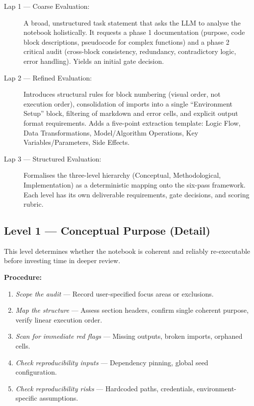 \documentclass[11pt, a4paper]{article}
\begin{document}
\begin{description}
  \item[Lap 1 — Coarse Evaluation:] A broad, unstructured task statement that
    asks the LLM to analyse the notebook holistically. It requests a phase 1
    documentation (purpose, code block descriptions, pseudocode for complex
    functions) and a phase 2 critical audit (cross-block consistency,
    redundancy, contradictory logic, error handling). Yields an initial gate
    decision.

  \item[Lap 2 — Refined Evaluation:] Introduces structural rules for block
    numbering (visual order, not execution order), consolidation of imports
    into a single ``Environment Setup'' block, filtering of markdown and error
    cells, and explicit output format requirements. Adds a five-point
    extraction template: Logic Flow, Data Transformations, Model/Algorithm
    Operations, Key Variables/Parameters, Side Effects.

  \item[Lap 3 — Structured Evaluation:] Formalises the three-level hierarchy
    (Conceptual, Methodological, Implementation) as a deterministic mapping
    onto the six-pass framework. Each level has its own deliverable
    requirements, gate decisions, and scoring rubric.
\end{description}

\subsection*{Level 1 — Conceptual Purpose (Detail)}

This level determines whether the notebook is coherent and reliably
re-executable before investing time in deeper review.

\textbf{Procedure:}
\begin{enumerate}
  \item \textit{Scope the audit} — Record user-specified focus areas or
    exclusions.
  \item \textit{Map the structure} — Assess section headers, confirm single
    coherent purpose, verify linear execution order.
  \item \textit{Scan for immediate red flags} — Missing outputs, broken
    imports, orphaned cells.
  \item \textit{Check reproducibility inputs} — Dependency pinning, global
    seed configuration.
  \item \textit{Check reproducibility risks} — Hardcoded paths, credentials,
    environment-specific assumptions.
\end{enumerate}
\end{document}
